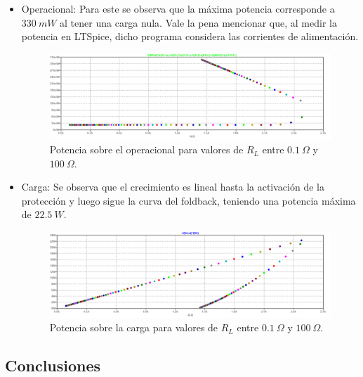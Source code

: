 \begin{itemize}
\item Operacional: Para este se observa que la máxima potencia corresponde a $330 \ mW$ al tener una carga nula. Vale la pena mencionar que, al medir la potencia en LTSpice, dicho programa considera las corrientes de alimentación.
\begin{figure}[H]
\centering
	\includegraphics[width=1\textwidth]{ImagenesEjercicio2/potopamp.png}
	\caption{Potencia sobre el operacional para valores de $R_L$ entre $0.1 \ \Omega$ y $100 \ \Omega$.}
	\label{fig:potop}
\end{figure}

\item Carga: Se observa que el crecimiento es lineal hasta la activación de la protección y luego sigue la curva del foldback, teniendo una potencia máxima de $22.5 \ W$.
\begin{figure}[H]
\centering
	\includegraphics[width=1\textwidth]{ImagenesEjercicio2/potload.png}
	\caption{Potencia sobre la carga para valores de $R_L$ entre $0.1 \ \Omega$ y $100 \ \Omega$.}
	\label{fig:potload}
\end{figure}
\end{itemize}

\subsection{Conclusiones}


